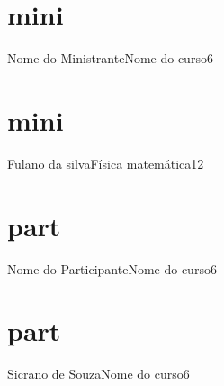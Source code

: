 \documentclass[
    12pt,       %
    a4paper,    %
    landscape   %
]{article}
\begin{document}
    \pagestyle{empty}
	
	\part{mini}{Nome do Ministrante}{Nome do curso}{6}
	\part{mini}{Fulano da silva}{Física matemática}{12}

	\part{part}{Nome do Participante}{Nome do curso}{6}
	\part{part}{Sicrano de Souza}{Nome do curso}{6}
\end{document}
